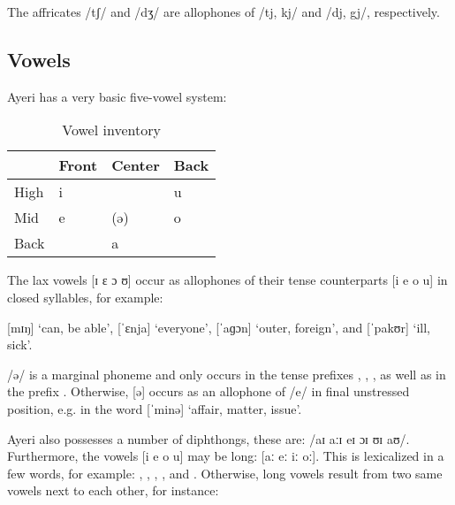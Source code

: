 The affricates /tʃ/ and /dʒ/ are allophones of /tj, kj/ and /dj, gj/, 
respectively.

\subsection{Vowels}

Ayeri has a very basic five-vowel system:

\begin{table}\centering
\label{tab:vowels}
\caption{Vowel inventory}
\begin{tabu} to .5\textwidth{H X[c] X[c] X[c]}
\toprule\tableheaderfont

	& Front
	& Center
	& Back
	\\

\toprule

High
	& i
	&
	& u
	\\

Mid
	& e
	& (ə)
	& o
	\\

Back
	&
	& a
	&
	\\

\bottomrule
\end{tabu}
\end{table}

The lax vowels [ɪ ɛ ɔ ʊ] occur as allophones of their tense counterparts 
[i e o u] in closed syllables, for example:

\pex
	\a {} [mɪŋ] `can, be able',
	\a {} [ˈɛnja] `everyone',
	\a {} [ˈaɡɔn] `outer, foreign', and
	\a {} [ˈpakʊr] `ill, sick'.
\xe

/ə/ is a marginal phoneme and only occurs in the tense prefixes 
, , , as 
well as in the prefix . Otherwise, [ə] occurs 
as an allophone of /e/ in final unstressed position, e.g. in the word 
 [ˈminə] `affair, matter, issue'.

Ayeri also possesses a number of diphthongs, these are: /aɪ aːɪ eɪ ɔɪ ʊɪ aʊ/.
Furthermore, the vowels [i e o u] may be long: [aː eː iː oː]. This is 
lexicalized in a few words, for example: , 
, , 
, and . Otherwise, long vowels 
result from two same vowels next to each other, for instance:


